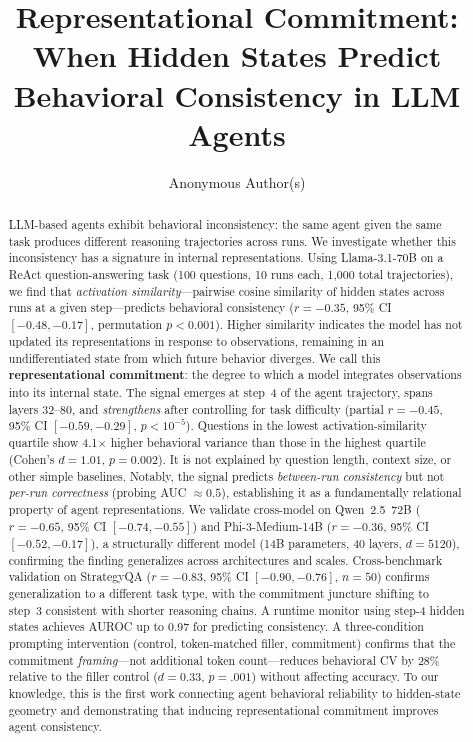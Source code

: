 \documentclass{article}
\title{Representational Commitment: \\ When Hidden States Predict Behavioral Consistency in LLM Agents}
\author{Anonymous Author(s)}
\begin{document}
\ifcolmsubmission
\linenumbers
\fi

\maketitle

\begin{abstract}
LLM-based agents exhibit behavioral inconsistency: the same agent given the same task produces different reasoning trajectories across runs. We investigate whether this inconsistency has a signature in internal representations. Using Llama-3.1-70B on a ReAct question-answering task (100 questions, 10 runs each, 1{,}000 total trajectories), we find that \emph{activation similarity}---pairwise cosine similarity of hidden states across runs at a given step---predicts behavioral consistency ($r = -0.35$, 95\% CI $[-0.48, -0.17]$, permutation $p < 0.001$). Higher similarity indicates the model has not updated its representations in response to observations, remaining in an undifferentiated state from which future behavior diverges. We call this \textbf{representational commitment}: the degree to which a model integrates observations into its internal state. The signal emerges at step~4 of the agent trajectory, spans layers 32--80, and \emph{strengthens} after controlling for task difficulty (partial $r = -0.45$, 95\% CI $[-0.59, -0.29]$, $p < 10^{-5}$). Questions in the lowest activation-similarity quartile show 4.1$\times$ higher behavioral variance than those in the highest quartile (Cohen's $d = 1.01$, $p = 0.002$). It is not explained by question length, context size, or other simple baselines. Notably, the signal predicts \emph{between-run consistency} but not \emph{per-run correctness} (probing AUC $\approx 0.5$), establishing it as a fundamentally relational property of agent representations. We validate cross-model on Qwen~2.5~72B ($r = -0.65$, 95\% CI $[-0.74, -0.55]$) and Phi-3-Medium-14B ($r = -0.36$, 95\% CI $[-0.52, -0.17]$), a structurally different model (14B parameters, 40 layers, $d{=}5120$), confirming the finding generalizes across architectures and scales. Cross-benchmark validation on StrategyQA ($r = -0.83$, 95\% CI $[-0.90, -0.76]$, $n{=}50$) confirms generalization to a different task type, with the commitment juncture shifting to step~3 consistent with shorter reasoning chains. A runtime monitor using step-4 hidden states achieves AUROC up to 0.97 for predicting consistency. A three-condition prompting intervention (control, token-matched filler, commitment) confirms that the commitment \emph{framing}---not additional token count---reduces behavioral CV by 28\% relative to the filler control ($d = 0.33$, $p = .001$) without affecting accuracy. To our knowledge, this is the first work connecting agent behavioral reliability to hidden-state geometry and demonstrating that inducing representational commitment improves agent consistency.
\end{abstract}
\end{document}
